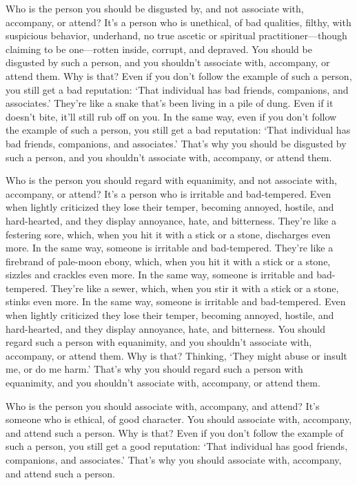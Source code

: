 \documentclass[12pt,openany]{book}%
\begin{document}
Who is the person you should be disgusted by, and not associate with, accompany, or attend? It’s a person who is unethical, of bad qualities, filthy, with suspicious behavior, underhand, no true ascetic or spiritual practitioner—though claiming to be one—rotten inside, corrupt, and depraved. You should be disgusted by such a person, and you shouldn’t associate with, accompany, or attend them. Why is that? Even if you don’t follow the example of such a person, you still get a bad reputation: ‘That individual has bad friends, companions, and associates.’ They’re like a snake that’s been living in a pile of dung. Even if it doesn’t bite, it’ll still rub off on you. In the same way, even if you don’t follow the example of such a person, you still get a bad reputation: ‘That individual has bad friends, companions, and associates.’ That’s why you should be disgusted by such a person, and you shouldn’t associate with, accompany, or attend them. 

Who is the person you should regard with equanimity, and not associate with, accompany, or attend? It’s a person who is irritable and bad-tempered. Even when lightly criticized they lose their temper, becoming annoyed, hostile, and hard-hearted, and they display annoyance, hate, and bitterness. They’re like a festering sore, which, when you hit it with a stick or a stone, discharges even more. In the same way, someone is irritable and bad-tempered. They’re like a firebrand of pale-moon ebony, which, when you hit it with a stick or a stone, sizzles and crackles even more. In the same way, someone is irritable and bad-tempered. They’re like a sewer, which, when you stir it with a stick or a stone, stinks even more. In the same way, someone is irritable and bad-tempered. Even when lightly criticized they lose their temper, becoming annoyed, hostile, and hard-hearted, and they display annoyance, hate, and bitterness. You should regard such a person with equanimity, and you shouldn’t associate with, accompany, or attend them. Why is that? Thinking, ‘They might abuse or insult me, or do me harm.’ That’s why you should regard such a person with equanimity, and you shouldn’t associate with, accompany, or attend them. 

Who is the person you should associate with, accompany, and attend? It’s someone who is ethical, of good character. You should associate with, accompany, and attend such a person. Why is that? Even if you don’t follow the example of such a person, you still get a good reputation: ‘That individual has good friends, companions, and associates.’ That’s why you should associate with, accompany, and attend such a person. 
\end{document}
